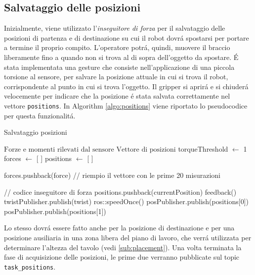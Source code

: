 \subsection{Salvataggio delle posizioni} \label{sub:positions}
Inizialmente, viene utilizzato l'\textit{inseguitore di forza} per il salvataggio delle posizioni di partenza e di destinazione 
su cui il robot dovr\'{a} spostarsi per portare a termine il proprio compito. 
L'operatore potr\'{a}, quindi, muovere il braccio liberamente fino a quando non si trova al di sopra dell'oggetto da spostare. 
\'{E} stata implementata una gesture che consiste nell'applicazione di una piccola torsione al sensore, 
per salvare la posizione attuale in cui si trova il robot, corrispondente al punto in cui si trova l'oggetto. Il gripper 
si aprir\'{a} e si chiuder\'{a} velocemente per indicare che la posizione \'{e} stata salvata correttamente nel vettore 
\verb|positions|. In Algorithm \ref{algo:positions} viene riportato lo pseudocodice per questa funzionalit\'{a}.
\begin{algorithm}[H]
    \caption{Salvataggio posizioni}\label{algo:positions}
    \begin{algorithmic}[1]
        \Require $\text{Forze e momenti rilevati dal sensore}$
        \Ensure $\text{Vettore di posizioni}$
        \State torqueThreshold $\gets$ 1
        \State forces $\gets$ [ ]
        \State positions $\gets$ [ ]
        
                \State forces.pushback(force) // riempio il vettore con le prime 20 misurazioni
            \Else

                // codice inseguitore di forza
                    \State positions.pushback(currentPosition)
                    \State feedback()
                \EndIf
                \State twistPublisher.publish(twist)
            \EndIf
            \State ros::speedOnce()
        \EndWhile
        \State posPublisher.publish(positions[0])
        \State posPublisher.publish(positions[1])
    \end{algorithmic}
    \end{algorithm}
Lo stesso dovr\'{a} essere fatto anche per la posizione di destinazione e per una posizione ausiliaria in una zona libera 
del piano di lavoro, che verr\'{a} utilizzata per determinare l'altezza del tavolo (vedi \ref{sub:placement}). 
Una volta terminata la fase di acquisizione delle posizioni, 
le prime due verranno pubblicate sul topic \verb|task_positions|.
